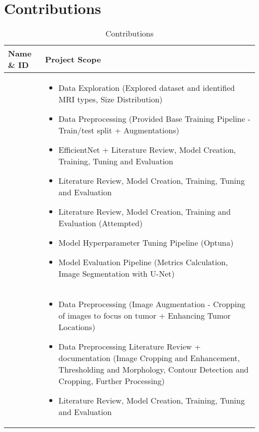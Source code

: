 \section{Contributions}\label{contribution}


\begin{longtable}{p{5cm}|p{9.5cm}}
  \caption{Contributions}
  \label{tab:contributions}
    \hline
    \textbf{Name} \& \textbf{ID} & \textbf{Project Scope}\\
    \hline

    \nameref{ss:wjw} &
        \begin{itemize}
            \item Data Exploration (Explored dataset and identified MRI types, Size Distribution)
            \item Data Preprocessing (Provided Base Training Pipeline - Train/test split + Augmentations)
            \item EfficientNet + \nameref{s:unet} Literature Review, Model Creation, Training, Tuning and Evaluation
            \item \nameref{s:inceptionv3} Literature Review, Model Creation, Training, Tuning and Evaluation
            \item \nameref{ss:vgg16} Literature Review, Model Creation, Training and Evaluation (Attempted)
            \item Model Hyperparameter Tuning Pipeline (Optuna)
            \item Model Evaluation Pipeline (Metrics Calculation, Image Segmentation with U-Net)
        \end{itemize}\\
        \hline

    \nameref{ss:blch} &
        \begin{itemize}
            \item Data Preprocessing (Image Augmentation - Cropping of images to focus on tumor + Enhancing Tumor Locations)
            \item Data Preprocessing Literature Review + documentation (Image Cropping and Enhancement, Thresholding and Morphology, Contour Detection and Cropping, Further Processing)
            \item \nameref{s:resnet50} Literature Review, Model Creation, Training, Tuning and Evaluation
        \end{itemize}\\
        \hline


\end{longtable}
